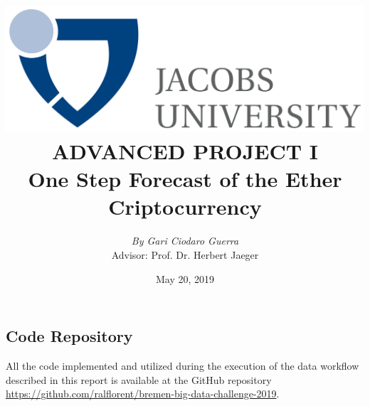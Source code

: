\documentclass{article}
\title{
    {\includegraphics[scale=0.15]{logo-black.png}} \\
    \vspace{1.4cm}
    {\large \textbf{ADVANCED PROJECT I}} \\
    {\large \textbf{One Step Forecast of the Ether Criptocurrency}} \\
}
\author{\textit{By Gari Ciodaro Guerra}\\[0.2cm]{\small Advisor: Prof. Dr. Herbert Jaeger}}
\date{May 20, 2019}
\begin{document}
\maketitle


\newpage





\clearpage
\appendix
\begin{appendices}
\section{Code Repository}

All the code implemented and utilized during the execution of the data workflow
described in this report is available at the GitHub repository \href{https://github.com/ralflorent/bremen-big-data-challenge-2019}{https://github.com/ralflorent/bremen-big-data-challenge-2019}.

\end{appendices}

\clearpage
\newpage
\printbibliography
\end{document}
